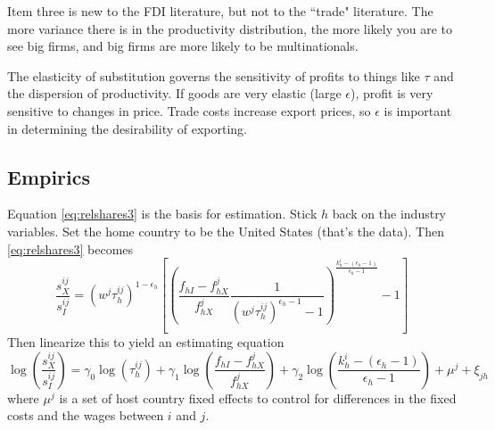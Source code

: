 \documentclass[11pt, pdftex]{article}
\begin{document}
Item three is new to the FDI literature, but not to the ``trade" literature.  The more variance there is in the productivity distribution, the more likely you are to see big firms, and big firms are more likely to be multinationals.

The elasticity of substitution governs the sensitivity of profits to things like $\tau$ and the dispersion of productivity.  If goods are very elastic (large $\epsilon$), profit is very sensitive to changes in price.  Trade costs increase export prices, so $\epsilon$ is important in determining the desirability of exporting.

\subsection*{Empirics}
Equation \ref{eq:relshares3} is the basis for estimation.  Stick $h$ back on the industry variables.  Set the home country to be the United States (that's the data).  Then \eqref{eq:relshares3} becomes
\begin{equation}\label{eq:relshares3}
    \frac{s_X^{ij}}{s_I^{ij}}=(w^j\tau_{h}^{ij})^{1-\epsilon_h} \left[ \left(\frac{f_{hI}-f_{hX}^j}{f_{hX}^j} \frac{1}{(w^j\tau_h^{ij})^{\epsilon_h-1}-1}\right)^{\frac{k_h^i-(\epsilon_h-1)}{\epsilon_h-1}}-1 \right]
\end{equation}
Then linearize this to yield an estimating equation
\begin{equation}\label{eq:relshares3}
   \log\left( \frac{s_X^{ij}}{s_I^{ij}}\right)=\gamma_0\log(\tau_{h}^{ij}) + \gamma_1 \log \left( \frac{f_{hI}-f_{hX}^j}{f_{hX}^j}\right) + \gamma_2 \log\left(\frac{k_h^i-(\epsilon_h-1)}{\epsilon_h-1}\right) + \mu^j+\xi_{jh}
\end{equation}
where $\mu^j$ is a set of host country fixed effects to control for  differences in the fixed costs and the wages between $i$ and $j$.
\end{document}

